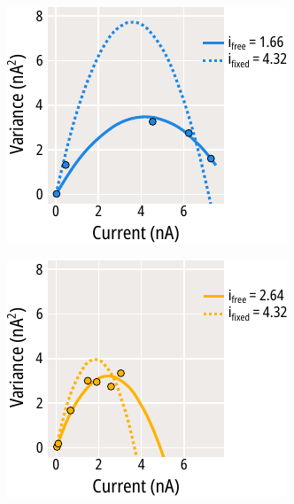 \begin{figure}[h]
\begin{subfigure}[t]{0.3\textwidth}
	\end{subfigure}
	\vfill
	\begin{subfigure}[t]{0.3\textwidth}
		\caption{}\label{ch4fig:noise_example_fits_1}
		\centering
		\includegraphics[width=\textwidth]{noise_example_fits_1.pdf}
	\end{subfigure}
	\hfill
	\begin{subfigure}[t]{0.3\textwidth}
		\caption{}\label{ch4fig:noise_example_fits_2}
		\centering
		\includegraphics[width=\textwidth]{noise_example_fits_2.pdf}

\end{subfigure}
\end{figure}
